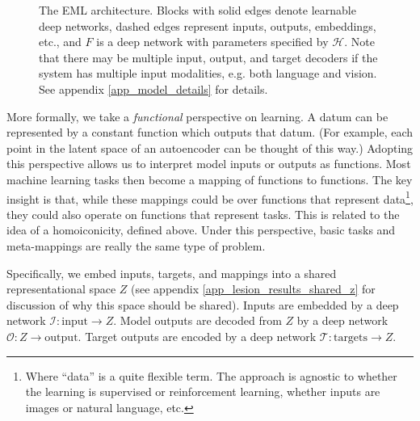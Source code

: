 \documentclass{article}
\begin{document}
\begin{figure}
\caption{The EML architecture. Blocks with solid edges denote learnable deep networks, dashed edges represent inputs, outputs, embeddings, etc., and $F$ is a deep network with parameters specified by $\mathcal{H}$. Note that there may be multiple input, output, and target decoders if the system has multiple input modalities, e.g. both language and vision. See appendix \ref{app_model_details} for details.} \label{architecture_fig}
\end{figure}
More formally, we take a \emph{functional} perspective on learning. A datum can be represented by a constant function which outputs that datum. (For example, each point in the latent space of an autoencoder can be thought of this way.) Adopting this perspective allows us to interpret model inputs or outputs as functions. Most machine learning tasks then become a mapping of functions to functions. The key insight is that, while these mappings could be over functions that represent data\footnote{Where ``data'' is a quite flexible term. The approach is agnostic to whether the learning is supervised or reinforcement learning, whether inputs are images or natural language, etc.}, they could also operate on functions that represent tasks. This is related to the idea of a homoiconicity, defined above. Under this perspective, basic tasks and meta-mappings are really the same type of problem. \par
Specifically, we embed inputs, targets, and mappings into a shared representational space $Z$ (see appendix \ref{app_lesion_results_shared_z} for discussion of why this space should be shared). Inputs are embedded by a deep network $\mathcal{I}: \text{input} \rightarrow Z$. Model outputs are decoded from $Z$ by a deep network $\mathcal{O}: Z \rightarrow \text{output}$. Target outputs are encoded by a deep network $\mathcal{T}: \text{targets} \rightarrow Z$.\par
\end{document}
